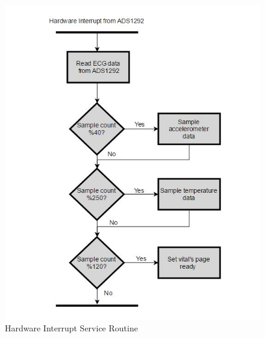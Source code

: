  
 \begin{figure}[h]
 	\centering
 	\includegraphics[scale = 1 ]{ECG_interrupt.JPG}
 	\caption{Hardware Interrupt Service Routine\label{ecg_isr}}
 \end{figure}

